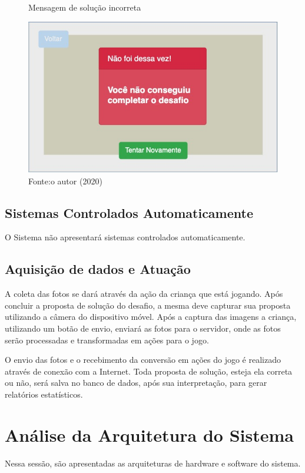     \begin{figure}[h!]
        \centering
        \caption{Mensagem de solução incorreta}
        \includegraphics[width=12cm]{images/cap3/solucao_incorreta.jpg}
        \caption*{Fonte:o autor (2020)}
        \label{figura:solucao_incorreta}
    \end{figure}
    
    
    \subsection{Sistemas Controlados Automaticamente}
    O Sistema não apresentará sistemas controlados automaticamente.
    
    \subsection{Aquisição de dados e Atuação}
    A coleta das fotos se dará através da ação da criança que está jogando. Após concluir a proposta de solução do desafio, a mesma deve capturar sua proposta utilizando a câmera do dispositivo móvel.
    Após a captura das imagens a criança, utilizando um botão de envio, enviará as fotos para o servidor, onde as fotos serão processadas e transformadas em ações para o jogo.
    
    O envio das fotos e o recebimento da conversão em ações do jogo é realizado através de conexão com a Internet.
    Toda proposta de solução, esteja ela correta ou não, será salva no banco de dados, após sua interpretação, para gerar relatórios estatísticos.


\section{Análise da Arquitetura do Sistema}
    Nessa sessão, são apresentadas as arquiteturas de hardware e software do sistema.

